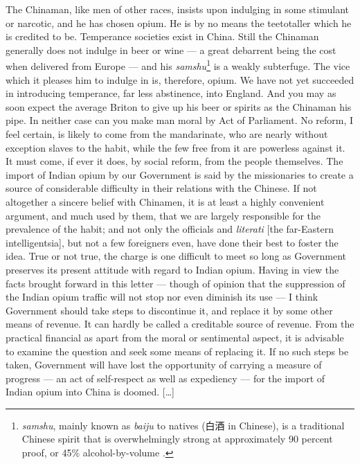 \begin{mdframed}[style=fancyquote]
        [\ldots] The Chinaman, like men of other races, insists upon indulging
        in some stimulant or narcotic, and he has chosen opium. He is by no
        means the teetotaller which he is credited to be. Temperance societies
        exist in China. Still the Chinaman generally does not indulge in beer or
        wine --- a great debarrent being the cost when delivered from Europe ---
        and his \textit{samshu}\footnote{\textit{samshu}, mainly known as
        \textit{baiju} to natives (白酒 in Chinese), is a traditional Chinese
        spirit that is overwhelmingly strong at approximately 90 percent proof,
        or 45\% alcohol-by-volume \autocite{Antkiewicz:1993}.} is a weakly
        subterfuge. The vice which it pleases him to indulge in is, therefore,
        opium. We have not yet succeeded in introducing temperance, far less
        abstinence, into England.  And you may as soon expect the average Briton
        to give up his beer or spirits as the Chinaman his pipe.  In neither
        case can you make man moral by Act of Parliament. No reform, I feel
        certain, is likely to come from the mandarinate, who are nearly without
        exception slaves to the habit, while the few free from it are powerless
        against it. It must come, if ever it does, by social reform, from the
        people themselves. The import of Indian opium by our Government is said
        by the missionaries to create a source of considerable difficulty in
        their relations with the Chinese.  If not altogether a sincere belief
        with Chinamen, it is at least a highly convenient argument, and much
        used by them, that we are largely responsible for the prevalence of the
        habit; and not only the officials and \textit{literati} [the far-Eastern
        intelligentsia], but not a few foreigners even, have done their best to
        foster the idea. True or not true, the charge is one difficult to meet
        so long as Government preserves its present attitude with regard to
        Indian opium. Having in view the facts brought forward in this letter
        --- though of opinion that the suppression of the Indian opium traffic
        will not stop nor even diminish its use --- I think Government should
        take steps to discontinue it, and replace it by some other means of
        revenue. It can hardly be called a creditable source of revenue. From
        the practical financial as apart from the moral or sentimental aspect,
        it is advisable to examine the question and seek some means of replacing
        it. If no such steps be taken, Government will have lost the opportunity
        of carrying a measure of progress --- an act of self-respect as well as
        expediency --- for the import of Indian opium into China is doomed.
        [\ldots]
	\begin{flushright}
		\autocite{SpecialCorrespondent:1884}
	\end{flushright}
\end{mdframed}
